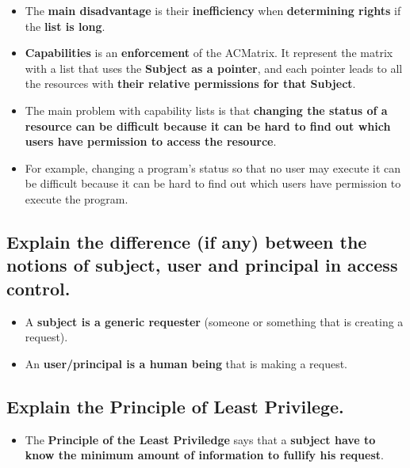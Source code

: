 \documentclass[9pt, letterpaper]{article}
\begin{document}
\begin{itemize}
\begin{itemize}
	      \end{itemize}
	\item The \textbf{main disadvantage} is their \textbf{inefficiency} when \textbf{determining rights} if the \textbf{list is long}.
	\item \textbf{Capabilities} is an \textbf{enforcement} of the ACMatrix. It represent the matrix with a list that uses the \textbf{Subject as a pointer}, and each pointer leads to all the resources with \textbf{their relative permissions for that Subject}.
	\item The main problem with capability lists is that \textbf{changing the status of a resource can be difficult because it can be hard to find out which users have permission to access the resource}.
	\item For example, changing a program’s status so that no user may execute it can be difficult because it can be hard to find out which users have permission to execute the program.
\end{itemize}

\subsection{Explain the difference (if any) between the notions of subject, user and principal in access control.}
\begin{itemize}
	\item A \textbf{subject is a generic requester} (someone or something that is creating a request).
	\item An \textbf{user/principal is a human being} that is making a request.
\end{itemize}

\subsection{Explain the Principle of Least Privilege.}
\begin{itemize}
	\item The \textbf{Principle of the Least Priviledge} says that a \textbf{subject have to know the minimum amount of information to fullify his request}.
\end{itemize}
\end{document}
